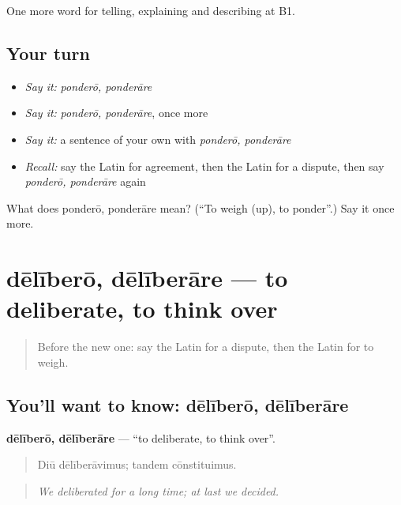 \begin{grammarlens}[title={What you've built}]
One more word for telling, explaining and describing at B1.
\end{grammarlens}

\subsection*{Your turn}
\begin{itemize}
\raggedright
  \item \emph{Say it:} \emph{ponderō, ponderāre}
  \item \emph{Say it:} \emph{ponderō, ponderāre}, once more
  \item \emph{Say it:} a sentence of your own with \emph{ponderō, ponderāre}
  \item \emph{Recall:} say the Latin for agreement, then the Latin for a dispute, then say \emph{ponderō, ponderāre} again
\end{itemize}

\begin{tcolorbox}[breakable,colback=teal!4,colframe=teal!35!black,title={Before you move on}]
What does ponderō, ponderāre mean? (\textquotedblleft{}To weigh (up), to ponder\textquotedblright{}.) Say it once more.
\end{tcolorbox}
\section[dēlīberō, dēlīberāre]{dēlīberō, dēlīberāre — to deliberate, to think over}

\label{lesson:LA-C359-delibero}



\begin{quote}
Before the new one: say the Latin for a dispute, then the Latin for to weigh.
\end{quote}

\subsection*{You'll want to know: dēlīberō, dēlīberāre}
\textbf{dēlīberō, dēlīberāre} — \textquotedblleft{}to deliberate, to think over\textquotedblright{}.

\begin{quote}
Diū dēlīberāvimus; tandem cōnstituimus.
\end{quote}

\begin{quote}
\emph{We deliberated for a long time; at last we decided.}
\end{quote}

